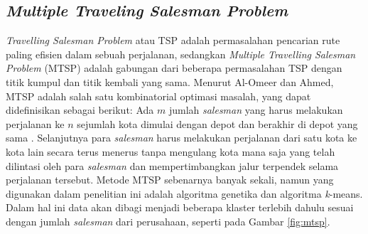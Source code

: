 \subsection{\textit{Multiple Traveling Salesman Problem}}

\textit{Travelling Salesman Problem} atau TSP adalah permasalahan pencarian rute paling efisien dalam sebuah perjalanan, sedangkan \textit{Multiple Travelling Salesman Problem} (MTSP) adalah gabungan dari beberapa permasalahan TSP dengan titik kumpul dan titik kembali yang sama. Menurut Al-Omeer dan Ahmed, MTSP adalah salah satu kombinatorial optimasi masalah, yang dapat didefinisikan sebagai berikut: Ada $m$ jumlah \textit{salesman} yang harus melakukan perjalanan ke $n$ sejumlah kota dimulai dengan depot dan berakhir di depot yang sama \cite{al2019comparative}. Selanjutnya para \textit{salesman} harus melakukan perjalanan dari satu kota ke kota lain secara terus menerus tanpa mengulang kota mana saja yang telah dilintasi oleh para \textit{salesman} dan mempertimbangkan jalur terpendek selama perjalanan tersebut. Metode MTSP sebenarnya banyak sekali, namun yang digunakan dalam penelitian ini adalah algoritma genetika dan algoritma \textit{k}-means. Dalam hal ini data akan dibagi menjadi beberapa klaster terlebih dahulu sesuai dengan jumlah \textit{salesman} dari perusahaan, seperti pada Gambar \ref{fig:mtsp}.

